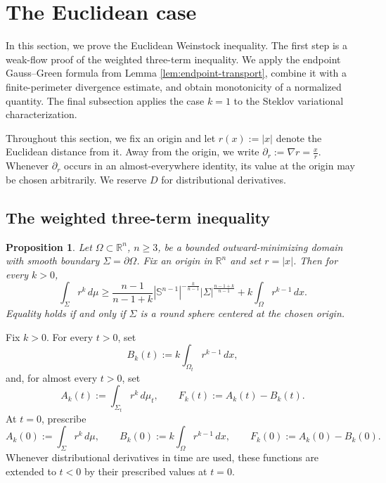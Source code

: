 \documentclass[11pt,reqno]{amsart}
\numberwithin{equation}{section}
\newtheorem{proposition}[theorem]{Proposition}
\theoremstyle{definition}
\newcommand{\R}{\mathbb R}
\newcommand{\Sn}{\mathbb S}
\newcommand{\Om}{\Omega}
\newcommand{\Sig}{\Sigma}
\begin{document}
\section{The Euclidean case}\label{sec.3}

In this section, we prove the Euclidean Weinstock inequality.  The first step is a weak-flow proof of the weighted three-term inequality.  We apply the endpoint Gauss--Green formula from Lemma \ref{lem:endpoint-transport}, combine it with a finite-perimeter divergence estimate, and obtain monotonicity of a normalized quantity. The final subsection applies the case $k=1$ to the Steklov variational characterization.

Throughout this section, we fix an origin and let $r(x):=|x|$ denote the Euclidean distance from it. Away from the origin, we write $\partial_r:=\nabla r=\frac{x}{r}$. Whenever $\partial_r$ occurs in an almost-everywhere identity, its value at the origin may be chosen arbitrarily. We reserve $D$ for
distributional derivatives.

\subsection{The weighted three-term inequality}

\begin{proposition}\label{prop:weighted-three-term}
Let $\Om\subset\R^n$, $n\geq3$, be a bounded outward-minimizing domain with smooth boundary $\Sig=\partial\Om$.  Fix an origin in $\R^n$ and set $r=|x|$.  Then for every $k>0$,
\begin{equation}\label{eq:weighted-main}
    \int_\Sig r^k\,d\mu
    \geq
    \frac{n-1}{n-1+k}|\Sn^{n-1}|^{-\frac{k}{n-1}}
    |\Sig|^{\frac{n-1+k}{n-1}}
    + k\int_\Om r^{k-1}\,dx.
\end{equation}
Equality holds if and only if $\Sig$ is a round sphere centered at the chosen origin.
\end{proposition}

Fix $k>0$. For every $t>0$, set
\begin{equation*}
    B_k(t):=k\int_{\Om_t}r^{k-1}\,dx,
\end{equation*}
and, for almost every $t>0$, set
\begin{equation*}
    A_k(t):=\int_{\Sig_t}r^k\,d\mu_t,
    \qquad
    F_k(t):=A_k(t)-B_k(t).
\end{equation*}
At $t=0$, prescribe
\begin{equation*}
    A_k(0):=\int_{\Sig}r^k\,d\mu,
    \qquad
    B_k(0):=k\int_{\Om}r^{k-1}\,dx,
    \qquad
    F_k(0):=A_k(0)-B_k(0).
\end{equation*}
Whenever distributional derivatives in time are used, these functions are extended to $t<0$ by their prescribed values at $t=0$.
\end{document}
